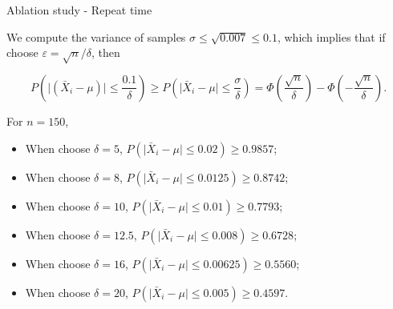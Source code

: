 \documentclass{beamer}
\begin{document}
\begin{frame}{Ablation study - Repeat time}

    We compute the variance of samples $\sigma \leq \sqrt{0.007} \leq 0.1$, which implies that if choose $\varepsilon = \sqrt{n} / \delta$, then

    $$
        P\left(\vert (\bar{X}_i - \mu)\vert \leq \frac{0.1}{\delta}\right) \geq P\left(\vert \bar{X}_i - \mu \vert \leq \frac{\sigma}{\delta}\right) = \varPhi\left(\frac{\sqrt{n}}{\delta}\right) - \varPhi\left(-\frac{\sqrt{n}}{\delta}\right).
    $$

    For $n = 150$,

    \begin{itemize}
        \item When choose $\delta = 5$, $P(\vert \bar{X}_i - \mu \vert \leq 0.02) \geq 0.9857$;
        \item When choose $\delta = 8$, $P(\vert \bar{X}_i - \mu \vert \leq 0.0125) \geq 0.8742$;
        \item When choose $\delta = 10$, $P(\vert \bar{X}_i - \mu \vert \leq 0.01) \geq 0.7793$;
        \item When choose $\delta = 12.5$, $P(\vert \bar{X}_i - \mu \vert \leq 0.008) \geq 0.6728$;
        \item When choose $\delta = 16$, $P(\vert \bar{X}_i - \mu \vert \leq 0.00625) \geq 0.5560$;
        \item When choose $\delta = 20$, $P(\vert \bar{X}_i - \mu \vert \leq 0.005) \geq 0.4597$.
    \end{itemize}

\end{frame}
\end{document}
